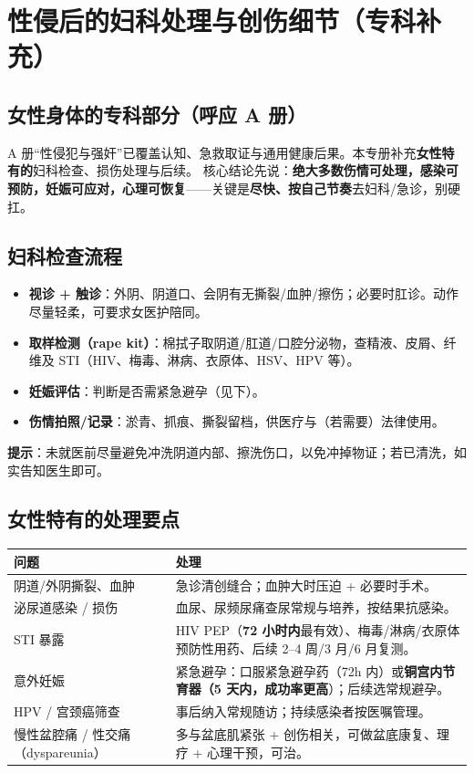 \chapter{性侵后的妇科处理与创伤细节（专科补充）}

\section{女性身体的专科部分（呼应 A 册）}
A 册“性侵犯与强奸”已覆盖认知、急救取证与通用健康后果。本专册补充\textbf{女性特有的}妇科检查、损伤处理与后续。
核心结论先说：\textbf{绝大多数伤情可处理，感染可预防，妊娠可应对，心理可恢复}——关键是\textbf{尽快、按自己节奏}去妇科/急诊，别硬扛。

\section{妇科检查流程}
\begin{itemize}
  \item \textbf{视诊 + 触诊}：外阴、阴道口、会阴有无撕裂/血肿/擦伤；必要时肛诊。动作尽量轻柔，可要求女医护陪同。
  \item \textbf{取样检测（rape kit）}：棉拭子取阴道/肛道/口腔分泌物，查精液、皮屑、纤维及 STI（HIV、梅毒、淋病、衣原体、HSV、HPV 等）。
  \item \textbf{妊娠评估}：判断是否需紧急避孕（见下）。
  \item \textbf{伤情拍照/记录}：淤青、抓痕、撕裂留档，供医疗与（若需要）法律使用。
\end{itemize}
\textbf{提示}：未就医前尽量避免冲洗阴道内部、擦洗伤口，以免冲掉物证；若已清洗，如实告知医生即可。

\section{女性特有的处理要点}
\begin{tabularx}{\textwidth}{l X}
\toprule
\textbf{问题} & \textbf{处理} \\
\midrule
阴道/外阴撕裂、血肿 & 急诊清创缝合；血肿大时压迫 + 必要时手术。 \\
泌尿道感染 / 损伤 & 血尿、尿频尿痛查尿常规与培养，按结果抗感染。 \\
STI 暴露 & HIV PEP（\textbf{72 小时内}最有效）、梅毒/淋病/衣原体预防性用药、后续 2--4 周/3 月/6 月复测。 \\
意外妊娠 & 紧急避孕：口服紧急避孕药（72h 内）或\textbf{铜宫内节育器（5 天内，成功率更高}）；后续选常规避孕。 \\
HPV / 宫颈癌筛查 & 事后纳入常规随访；持续感染者按医嘱管理。 \\
慢性盆腔痛 / 性交痛（dyspareunia） & 多与盆底肌紧张 + 创伤相关，可做盆底康复、理疗 + 心理干预，可治。 \\
\bottomrule
\end{tabularx}

